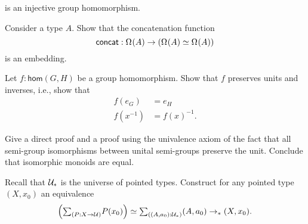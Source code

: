 \begin{exercises}
\begin{subexenum}
    is an injective group homomorphism.
  \item Consider a type $A$. Show that the concatenation function
    \begin{equation*}
      \mathsf{concat}:\Omega^{}(A)\to (\Omega^{}(A)\simeq\Omega^{}(A))
    \end{equation*}
    is an embedding.
  \end{subexenum}
\item Let $f:\mathsf{hom}(G,H)$ be a group homomorphism. Show that $f$ preserves units and inverses, i.e., show that
  \begin{align*}
    f(e_G) & = e_H \\
    f(x^{-1}) & = f(x)^{-1}.
  \end{align*}
\item Give a direct proof and a proof using the univalence axiom of the fact that all semi-group isomorphisms between unital semi-groups preserve the unit. Conclude that isomorphic monoids are equal.
\item Recall that $\mathcal{U}_\ast$ is the universe of pointed types. Construct for any pointed type $(X,x_0)$ an equivalence
  \begin{equation*}
    \Big(\sm{P:X\to \UU}P(x_0)\Big)\simeq \sm{(A,a_0):\UU_\ast}(A,a_0)\to_\ast(X,x_0).
  \end{equation*}
\end{exercises}
